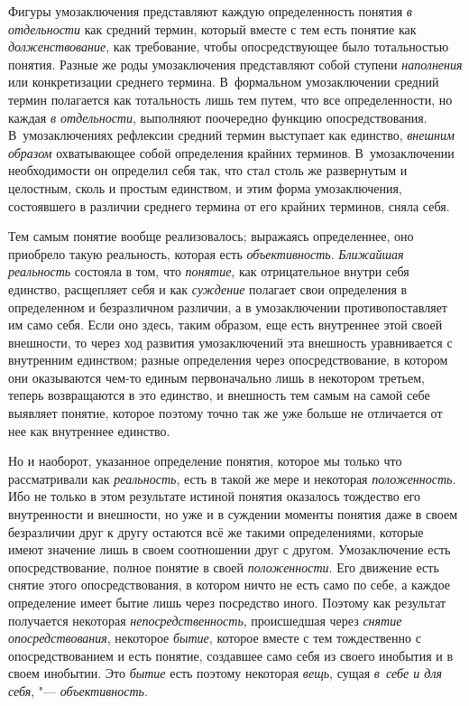 Фигуры умозаключения представляют каждую определенность
понятия {\em в отдельности}
как средний термин, который вместе с тем есть понятие как
{\em долженствование},
как требование, чтобы опосредствующее было тотальностью
понятия. Разные же роды умозаключения представляют собой ступени
{\em наполнения} или
конкретизации среднего термина. В~формальном умозаключении средний термин
полагается как тотальность лишь тем путем, что все определенности, но
каждая {\em в отдельности},
выполняют поочередно функцию опосредствования.
В~умозаключениях рефлексии средний термин выступает как единство,
{\em внешним образом} охватывающее собой определения крайних терминов.
В~умозаключении необходимости он определил себя так, что стал столь же
развернутым и целостным, сколь и простым единством, и этим форма
умозаключения, состоявшего в различии среднего термина от его крайних
терминов, сняла себя.

Тем самым понятие вообще реализовалось; выражаясь
определеннее, оно приобрело такую реальность, которая есть
{\em объективность}. {\em Ближайшая реальность} состояла в том, что
{\em понятие}, как отрицательное внутри себя единство, расщепляет себя и как
{\em суждение} полагает
свои определения в определенном и безразличном различии, а в умозаключении
противопоставляет им само себя. Если оно здесь, таким образом, еще есть
внутреннее этой своей внешности, то через ход развития умозаключений эта
внешность уравнивается с внутренним единством; разные определения через
опосредствование, в котором они оказываются чем-то единым первоначально
лишь в некотором третьем, теперь возвращаются в это единство, и внешность
тем самым на самой себе выявляет понятие, которое поэтому точно так же уже
больше не отличается от нее как внутреннее единство.

Но и наоборот, указанное определение понятия, которое мы
только что рассматривали как {\em реальность}, есть в
такой же мере и некоторая {\em положенность}. Ибо
не только в этом результате истиной понятия оказалось тождество его
внутренности и внешности, но уже и в суждении моменты понятия даже в своем
безразличии друг к другу остаются всё же такими определениями, которые
имеют значение лишь в своем соотношении друг с другом. Умозаключение есть
опосредствование, полное понятие в своей {\em положенности}. Его
движение есть снятие этого опосредствования, в котором ничто не есть само
по себе, а каждое определение имеет бытие лишь через посредство иного.
Поэтому как результат получается некоторая {\em непосредственность},
происшедшая через {\em снятие опосредствования}, некоторое {\em бытие},
которое вместе с тем тождественно с опосредствованием и есть
понятие, создавшее само себя из своего инобытия и в своем инобытии. Это
{\em бытие} есть поэтому некоторая {\em вещь}, сущая {\em в~себе и для
себя}, "--- {\em объективность}.

